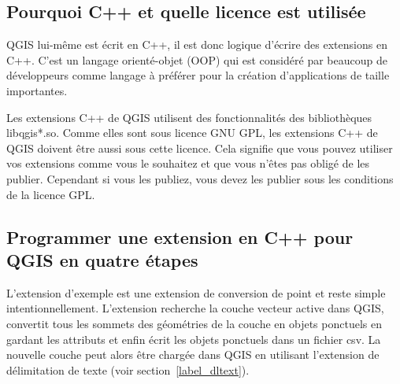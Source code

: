 \subsection{Pourquoi C++ et quelle licence est utilis\'ee}

QGIS lui-m\^eme est \'ecrit en C++, il est donc logique d'\'ecrire des extensions en C++.
C'est un langage orient\'e-objet (OOP) qui est consid\'er\'e par beaucoup de 
d\'eveloppeurs comme langage \`a pr\'ef\'erer pour la cr\'eation d'applications de taille 
importantes.

Les extensions C++ de QGIS utilisent des fonctionnalit\'es des biblioth\`eques 
libqgis*.so. Comme elles sont sous licence GNU GPL, les extensions C++ de QGIS 
doivent \^etre aussi sous cette licence. Cela signifie que vous pouvez utiliser 
vos extensions comme vous le souhaitez et que vous n'\^etes pas oblig\'e de les 
publier. Cependant si vous les publiez, vous devez les publier sous les 
conditions de la licence GPL.

\subsection{Programmer une extension en C++ pour QGIS en quatre \'etapes}

L'extension d'exemple est une extension de conversion de point et reste simple 
intentionnellement. L'extension recherche la couche vecteur active dans QGIS, 
convertit tous les sommets des g\'eom\'etries de la couche en objets ponctuels en 
gardant les attributs et enfin \'ecrit les objets ponctuels dans un fichier csv. 
La nouvelle couche peut alors \^etre charg\'ee dans QGIS en utilisant l'extension de 
d\'elimitation de texte (voir section~\ref{label_dltext}).

